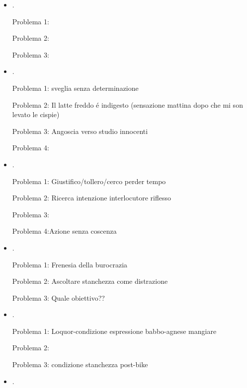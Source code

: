 \begin{itemize}
Problema 2: 

Problema 3: loquor

Problema 4: Dualit\'a obiettivo/impegni

\item {}.

Problema 1: 

Problema 2: 

Problema 3: 

\item {}.

Problema 1: sveglia senza determinazione

Problema 2: Il latte freddo \'e indigesto (sensazione mattina dopo che mi son levato le cispie)

Problema 3: Angoscia verso studio innocenti

Problema 4: 


\item {}.

Problema 1: Giustifico/tollero/cerco perder tempo

Problema 2: Ricerca intenzione interlocutore riflesso

Problema 3: 

Problema 4:Azione senza coscenza

\item {}.

Problema 1: Frenesia della burocrazia

Problema 2: Ascoltare stanchezza come distrazione

Problema 3: Quale obiettivo??

\item {}.

Problema 1: Loquor-condizione espressione babbo-agnese mangiare

Problema 2: 

Problema 3: condizione stanchezza post-bike

\item {}.


\end{itemize}

